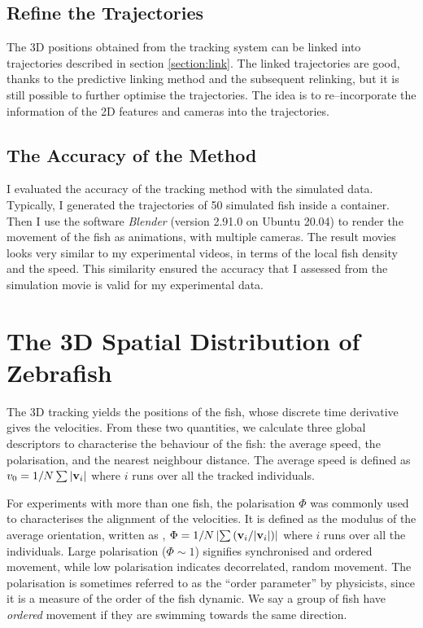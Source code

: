 \documentclass[11pt,twoside]{report}
\begin{document}
\subsection{Refine the Trajectories}

The 3D positions obtained from the tracking system can be linked into trajectories described in section \ref{section:link}. The linked trajectories are good, thanks to the predictive linking method and the subsequent relinking, but it is still possible to further optimise the trajectories. The idea is to re--incorporate the information of the 2D features and cameras into the trajectories.

\subsection{The Accuracy of the Method}

I evaluated the accuracy of the tracking method with the simulated data. Typically, I generated the trajectories of 50 simulated fish inside a container. Then I use the software \emph{Blender} (version 2.91.0 on Ubuntu 20.04) to render the movement of the fish as animations, with multiple cameras. The result movies looks very similar to my experimental videos, in terms of the local fish density and the speed. This similarity ensured the accuracy that I assessed from the simulation movie is valid for my experimental data.


\section{The 3D Spatial Distribution of Zebrafish}

The 3D tracking yields the positions of the fish, whose discrete time derivative gives the velocities. From these two quantities, we calculate three global descriptors to characterise the behaviour of the fish: the average speed, the polarisation, and the nearest neighbour distance. The average speed is defined as $v_0 = 1/N \sum{| \mathbf{v}_{i} |}$ where $i$ runs over all the tracked individuals. 

For experiments with more than one fish, the polarisation $\Phi$ was commonly used to characterises the alignment of the velocities. It is defined as the modulus of the average orientation, written as \cite{attanasi2014pcb},
$\Phi = 1/N \left| \sum{({ \mathbf{v}_{i} }/{|  \mathbf{v}_{i} |}}) \right|$ where $i$ runs over all the individuals. Large polarisation ($\Phi \sim 1$) signifies synchronised and ordered movement, while low polarisation indicates decorrelated, random movement. The polarisation is sometimes referred to as the ``order parameter'' by physicists, since it is a measure of the order of the fish dynamic. We say a group of fish have \emph{ordered} movement if they are swimming towards the same direction.
\end{document}
